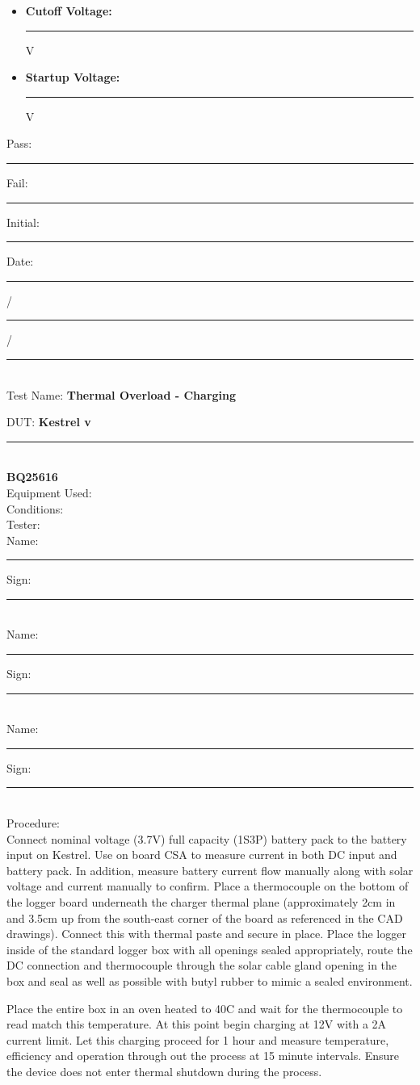\begin{itemize}
\item \textbf{Cutoff Voltage:} \rule{3cm}{0.15mm} V
\item \textbf{Startup Voltage:} \rule{3cm}{0.15mm} V
\end{itemize}



\vfill
{\large Pass: \rule{1cm}{0.15mm} \hspace{1cm} Fail: \rule{1cm}{0.15mm}} \hfill Initial: \rule{2cm}{0.15mm} \hspace{1cm} Date: \rule{0.5cm}{0.15mm}/\rule{0.5cm}{0.15mm}/\rule{1cm}{0.15mm}\\[5pt]

\pagebreak
{\Huge Test Name: \textbf{Thermal Overload - \break Charging}}\\[20pt]
{\Large DUT: \textbf{Kestrel v}\rule{1cm}{0.15mm}}\\ \textbf{BQ25616} \\[10pt]
{\Large Equipment Used: }\\[40pt]
{\Large Conditions: }\\[40pt]
{\Large Tester: }\\[10pt]
Name: \rule{4cm}{0.15mm} \hfill Sign: \rule{4cm}{0.15mm}\\[5pt]
Name: \rule{4cm}{0.15mm} \hfill Sign: \rule{4cm}{0.15mm}\\[5pt]
Name: \rule{4cm}{0.15mm} \hfill Sign: \rule{4cm}{0.15mm}\\[15pt]
{\Large Procedure: }\\
Connect nominal voltage (3.7V) full capacity (1S3P) battery pack to the battery input on Kestrel. Use on board CSA to measure current in both DC input and battery pack. In addition, measure battery current flow manually along with solar voltage and current manually to confirm. Place a thermocouple on the bottom of the logger board underneath the charger thermal plane (approximately 2cm in and 3.5cm up from the south-east corner of the board as referenced in the CAD drawings). Connect this with thermal paste and secure in place. Place the logger inside of the standard logger box with all openings sealed appropriately, route the DC connection and thermocouple through the solar cable gland opening in the box and seal as well as possible with butyl rubber to mimic a sealed environment. 

Place the entire box in an oven heated to 40\textdegree C and wait for the thermocouple to read match this temperature. At this point begin charging at 12V with a 2A current limit. Let this charging proceed for 1 hour and measure temperature, efficiency and operation through out the process at 15 minute intervals. Ensure the device does not enter thermal shutdown during the process. 

